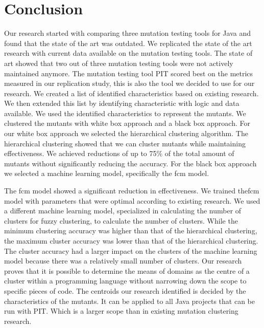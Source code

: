 \documentclass[../main]{subfiles}
\begin{document}
\chapter{Conclusion}
\label{ch:conclusion}
Our research started with comparing three mutation testing tools for Java and found that the state of the art was outdated.
We replicated the state of the art research with current data available on the mutation testing tools.
The state of art showed that two out of three mutation testing tools were not actively maintained anymore.
The mutation testing tool PIT scored best on the metrics measured in our replication study, this is also the tool we decided to use for our research.
\newline
We created a list of identified characteristics based on existing research. 
We then extended this list by identifying characteristic with logic and data available.
We used the identified characteristics to represent the mutants.
\newline
We clustered the mutants with white box approach and a black box approach.
For our white box approach we selected the hierarchical clustering algorithm.
The hierarchical clustering showed that we can cluster mutants while maintaining effectiveness.
We achieved reductions of up to 75\% of the total amount of mutants without significantly reducing the accuracy.
\newline
For the black box approach we selected a machine learning model, specifically the \acrlong{fcm} model.

The \acrshort{fcm} model showed a significant reduction in effectiveness.
We trained the\acrshort{fcm} model with parameters that were optimal according to existing research. 
We used a different machine learning model, specialized in calculating the number of clusters for fuzzy clustering, to calculate the number of clusters.
While the minimum clustering accuracy was higher than that of the hierarchical clustering, the maximum cluster accuracy was lower than that of the hierarchical clustering.
The cluster accuracy had a larger impact on the clusters of the machine learning model because there was a relatively small number of clusters.
Our research proves that it is possible to determine the means of domains as the centre of a cluster within a programming language without narrowing down the scope to specific pieces of code.
The centroids our research identified is decided by the characteristics of the mutants.
It can be applied to all Java projects that can be run with PIT. 
Which is a larger scope than in existing mutation clustering research.
\end{document}
